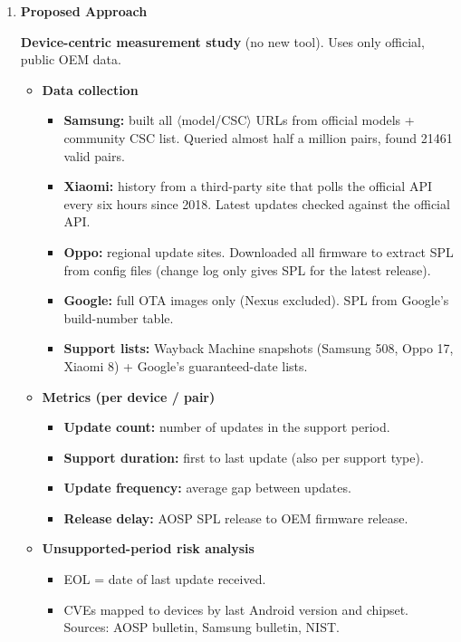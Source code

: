 \documentclass[11pt,a4paper]{article}
\newcommand{\entrypart}[1]{\textbf{\color{accent}#1}\par\vspace{2pt}}
\begin{document}
\begin{enumerate}
    \item \entrypart{Proposed Approach}

    \textbf{Device-centric measurement study} (no new tool). Uses only official, public OEM data.

    \begin{itemize}
        \item \textbf{Data collection}
        \begin{itemize}
            \item \textbf{Samsung:} built all $\langle$model/CSC$\rangle$ URLs from official models + community CSC list. Queried almost half a million pairs, found 21461 valid pairs.
            \item \textbf{Xiaomi:} history from a third-party site that polls the official API every six hours since 2018. Latest updates checked against the official API.
            \item \textbf{Oppo:} regional update sites. Downloaded all firmware to extract SPL from config files (change log only gives SPL for the latest release).
            \item \textbf{Google:} full OTA images only (Nexus excluded). SPL from Google's build-number table.
            \item \textbf{Support lists:} Wayback Machine snapshots (Samsung 508, Oppo 17, Xiaomi 8) + Google's guaranteed-date lists.
        \end{itemize}
        \item \textbf{Metrics (per device / pair)}
        \begin{itemize}
            \item \textbf{Update count:} number of updates in the support period.
            \item \textbf{Support duration:} first to last update (also per support type).
            \item \textbf{Update frequency:} average gap between updates.
            \item \textbf{Release delay:} AOSP SPL release to OEM firmware release.
        \end{itemize}
        \item \textbf{Unsupported-period risk analysis}
        \begin{itemize}
            \item EOL = date of last update received.
            \item CVEs mapped to devices by last Android version and chipset. Sources: AOSP bulletin, Samsung bulletin, NIST.

\end{itemize}
\end{itemize}
\end{enumerate}
\end{document}
